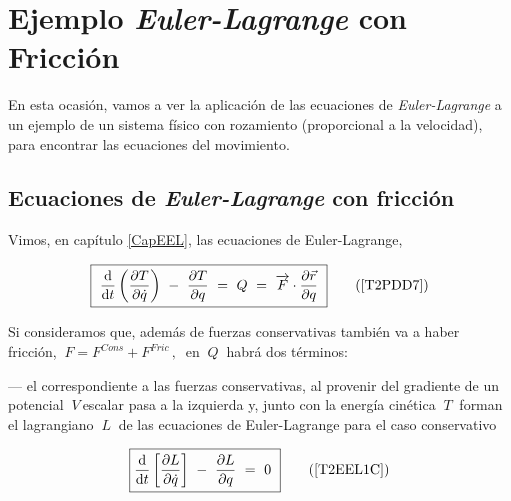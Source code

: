 \chapter{Ejemplo \emph{Euler-Lagrange} con Fricción}
\vspace{0.5cm}


\begin{adjustwidth}{50pt}{50pt}
\begin{ejemplo}
	En esta ocasión, vamos a ver la aplicación de las ecuaciones de \emph{Euler-Lagrange} a  un ejemplo de un sistema físico con rozamiento (proporcional a la velocidad), para encontrar las ecuaciones del movimiento.
\end{ejemplo}
\end{adjustwidth}

\vspace{0.5cm}

\section{Ecuaciones de \emph{Euler-Lagrange} con fricción}

\vspace{1cm}



Vimos, en capítulo \ref{CapEEL}, las ecuaciones de Euler-Lagrange,

\begin{equation}
\boxed{ \ 
\dv{t} \left( \pdv{T}{\dot q} \right) \ - \ \pdv{T}{q} \ = \ Q \ = \ \overrightarrow F \cdot \pdv{\vec r}{q}	
\ }
\tag{\ref{T2PDD7}}
\end{equation}



Si consideramos que, además de fuerzas conservativas también va a haber fricción, $\ F=F^{Cons}+F^{Fric} \, , \ $ en $\ Q \ $ habrá dos términos: 

--- el correspondiente a las fuerzas conservativas, al provenir del gradiente de un potencial $\ V \ $escalar pasa a la izquierda y, junto con la energía cinética $\ T \ $ forman el lagrangiano $ \ L \ $ de las ecuaciones de Euler-Lagrange para el caso conservativo 

\begin{equation}
\boxed{
\dv{t} \left[ \pdv{ L }{\dot q} \right] \ - \ \pdv{L}{q} \ = \ 0	
\ } 
\tag{\ref{T2EEL1C}}
\end{equation}

